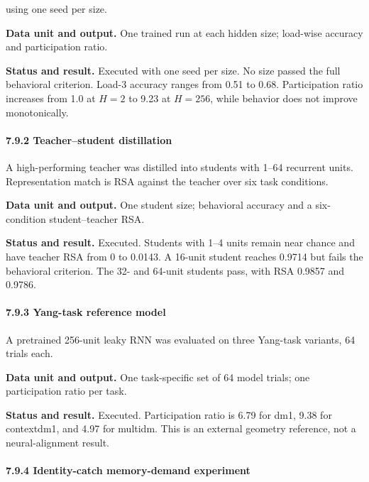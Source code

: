 \documentclass[
  10pt,
]{article}
\begin{document}
using one seed per size.

\textbf{Data unit and output.} One trained run at each hidden size;
load-wise accuracy and participation ratio.

\textbf{Status and result.} Executed with one seed per size. No size
passed the full behavioral criterion. Load-3 accuracy ranges from 0.51
to 0.68. Participation ratio increases from 1.0 at \(H=2\) to 9.23 at
\(H=256\), while behavior does not improve monotonically.

\hypertarget{teacherstudent-distillation}{%
\paragraph{7.9.2 Teacher--student
distillation}\label{teacherstudent-distillation}}

A high-performing teacher was distilled into students with 1--64
recurrent units. Representation match is RSA against the teacher over
six task conditions.

\textbf{Data unit and output.} One student size; behavioral accuracy and
a six-condition student--teacher RSA.

\textbf{Status and result.} Executed. Students with 1--4 units remain
near chance and have teacher RSA from 0 to 0.0143. A 16-unit student
reaches 0.9714 but fails the behavioral criterion. The 32- and 64-unit
students pass, with RSA 0.9857 and 0.9786.

\hypertarget{yang-task-reference-model}{%
\paragraph{7.9.3 Yang-task reference
model}\label{yang-task-reference-model}}

A pretrained 256-unit leaky RNN was evaluated on three Yang-task
variants, 64 trials each.

\textbf{Data unit and output.} One task-specific set of 64 model trials;
one participation ratio per task.

\textbf{Status and result.} Executed. Participation ratio is 6.79 for
dm1, 9.38 for contextdm1, and 4.97 for multidm. This is an external
geometry reference, not a neural-alignment result.

\hypertarget{identity-catch-memory-demand-experiment}{%
\paragraph{7.9.4 Identity-catch memory-demand
experiment}\label{identity-catch-memory-demand-experiment}}
\end{document}
